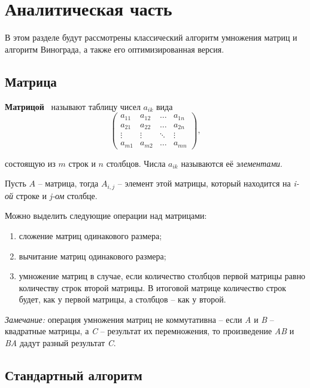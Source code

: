 \chapter{Аналитическая часть}
В этом разделе будут рассмотрены классический алгоритм умножения матриц и алгоритм Винограда, а также его оптимизированная версия.


\section{Матрица}

\textbf{Матрицой}~\cite{matrix} называют таблицу чисел $a_{ik}$ вида
\begin{equation}
	\begin{pmatrix}
		a_{11} & a_{12} & \ldots & a_{1n}\\
		a_{21} & a_{22} & \ldots & a_{2n}\\
		\vdots & \vdots & \ddots & \vdots\\
		a_{m1} & a_{m2} & \ldots & a_{mn}
	\end{pmatrix},
\end{equation}

состоящую из $m$ строк и $n$ столбцов. Числа $a_{ik}$ называются её \textit{элементами}.

Пусть $A$ -- матрица, тогда $A_{i,j}$ -- элемент этой матрицы, который находится на \textit{i-ой} строке и \textit{j-ом} столбце.

Можно выделить следующие операции над матрицами:
\begin{enumerate}[label=\arabic*)]
    \item сложение матриц одинакового размера;
    \item вычитание матриц одинакового размера;
    \item умножение матриц в случае, если количество столбцов первой матрицы равно количеству строк второй матрицы. В итоговой матрице количество строк будет, как у первой матрицы, а столбцов -- как у второй. \newline
\end{enumerate}

\textit{Замечание:} операция умножения матриц не коммутативна -- если \textit{A} и \textit{B} -- квадратные матрицы, а \textit{C} -- результат их перемножения, то произведение \textit{AB} и \textit{BA} дадут разный результат \textit{C}.
\clearpage

\section{Стандартный алгоритм}

